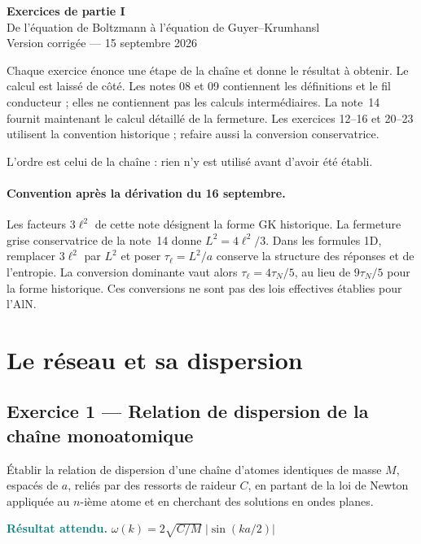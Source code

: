 \documentclass[11pt,a4paper]{article}
\newcommand{\rep}[1]{\par\smallskip\noindent\textcolor{teal}{\textbf{Résultat attendu.}}\; #1\par\smallskip}
\begin{document}
\begin{center}
{\Large\bfseries Exercices de partie I}\\[5pt]
{\normalsize De l'équation de Boltzmann à l'équation de Guyer--Krumhansl}\\[2pt]
{\small Version corrigée --- 15 septembre 2026}
\end{center}

\vspace{4pt}

Chaque exercice énonce une étape de la chaîne et donne le résultat à obtenir. Le calcul est laissé de
côté. Les notes 08 et 09 contiennent les définitions et le fil conducteur ; elles ne contiennent pas
les calculs intermédiaires. La note~14 fournit maintenant le calcul détaillé de la fermeture.
Les exercices 12--16 et 20--23 utilisent la convention historique ; refaire aussi la conversion conservatrice.

L'ordre est celui de la chaîne : rien n'y est utilisé avant d'avoir été établi.

\paragraph{Convention après la dérivation du 16 septembre.}
Les facteurs $3\ell^2$ de cette note désignent la forme GK historique.
La fermeture grise conservatrice de la note~14 donne $L^2=4\ell^2/3$.
Dans les formules 1D, remplacer $3\ell^2$ par $L^2$ et poser
$\tau_\ell=L^2/a$ conserve la structure des réponses et de l'entropie.
La conversion dominante vaut alors $\tau_\ell=4\tau_N/5$, au lieu de
$9\tau_N/5$ pour la forme historique. Ces conversions ne sont pas des
lois effectives établies pour l'AlN.

\section{Le réseau et sa dispersion}

\subsection*{Exercice 1 --- Relation de dispersion de la chaîne monoatomique}

Établir la relation de dispersion d'une chaîne d'atomes identiques de masse $M$, espacés de $a$,
reliés par des ressorts de raideur $C$, en partant de la loi de Newton appliquée au $n$-ième atome
et en cherchant des solutions en ondes planes.

\rep{$\omega(k) = 2\sqrt{C/M}\;\bigl|\sin(ka/2)\bigr|$}
\end{document}
